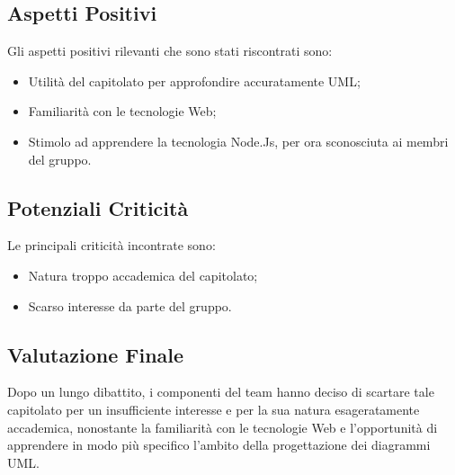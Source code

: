 \subsection{Aspetti Positivi}
	Gli aspetti positivi rilevanti che sono stati riscontrati sono:
	\begin{itemize}
		\item Utilità del capitolato per approfondire accuratamente UML;
		\item Familiarità con le tecnologie Web;
		\item Stimolo ad apprendere la tecnologia Node.Js, per ora sconosciuta ai membri del gruppo.
	\end{itemize}

\subsection{Potenziali Criticità}
	Le principali criticità incontrate sono:
	\begin{itemize}
		\item Natura troppo accademica del capitolato;
		\item Scarso interesse da parte del gruppo.
	\end{itemize}

\subsection{Valutazione Finale}
	Dopo un lungo dibattito, i componenti del team hanno deciso di scartare tale capitolato per un insufficiente interesse e per la sua natura esageratamente accademica, nonostante la familiarità con le tecnologie Web e l'opportunità di apprendere in modo più specifico l'ambito della progettazione dei diagrammi UML. 
	
